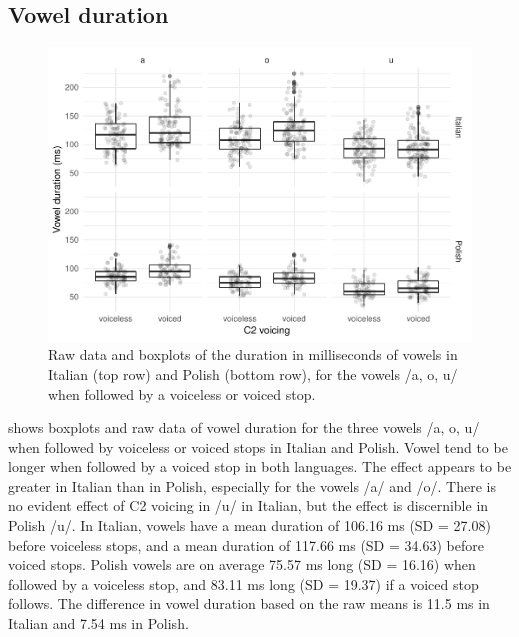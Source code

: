 \documentclass[12pt,]{article}
\begin{document}
\hypertarget{vowel-duration}{%
\subsection{Vowel duration}\label{vowel-duration}}

\label{s:vduration}

\begin{figure}
\includegraphics[width=\linewidth]{2018-relrel_files/figure-latex/Figure2} \caption{Raw data and boxplots of the duration in milliseconds of vowels in Italian (top row) and Polish (bottom row), for the vowels /a, o, u/ when followed by a voiceless or voiced stop.}\label{f:Figure2}
\end{figure}

 shows boxplots and raw data of vowel duration for the
three vowels /a, o, u/ when followed by voiceless or voiced stops in
Italian and Polish. Vowel tend to be longer when followed by a voiced
stop in both languages. The effect appears to be greater in Italian than
in Polish, especially for the vowels /a/ and /o/. There is no evident
effect of C2 voicing in /u/ in Italian, but the effect is discernible in
Polish /u/. In Italian, vowels have a mean duration of 106.16 ms (SD =
27.08) before voiceless stops, and a mean duration of 117.66 ms (SD =
34.63) before voiced stops. Polish vowels are on average 75.57 ms long
(SD = 16.16) when followed by a voiceless stop, and 83.11 ms long (SD =
19.37) if a voiced stop follows. The difference in vowel duration based
on the raw means is 11.5 ms in Italian and 7.54 ms in Polish.
\end{document}
